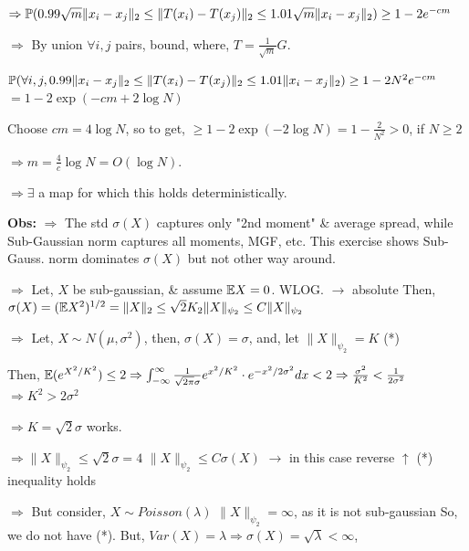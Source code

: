 \documentclass[12pt]{article}
\begin{document}
$\Rightarrow \mathbb{P}(0.99 \sqrt{m} \|x_i-x_j\|_2 \leq \|T(x_i)-T(x_j)\|_2 \leq 1.01 \sqrt{m} \|x_i-x_j\|_2) \geq 1 - 2e^{-cm}$

$\Rightarrow$ By union $\forall i,j$ pairs,
bound, \hspace{4cm} where, $T = \frac{1}{\sqrt{m}} G$.

$\mathbb{P}(\forall i,j, 0.99 \|x_i-x_j\|_2 \leq \|T(x_i)-T(x_j)\|_2 \leq 1.01 \|x_i-x_j\|_2) \geq 1 - 2N^2e^{-cm}$
\hspace{7cm} $= 1 - 2\exp(-cm+2\log N)$

Choose $cm = 4\log N$, so to get, $\geq 1 - 2\exp(-2\log N) = 1 - \frac{2}{N^2} > 0$, if $N \geq 2$

$\Rightarrow m = \frac{4}{c}\log N = O(\log N)$.

$\Rightarrow \exists$ a map for which this holds deterministically.

\textbf{Obs:}
$\Rightarrow$ The std $\sigma(X)$ captures only "2nd moment" \& average spread, while Sub-Gaussian
norm captures all moments, MGF, etc. This exercise shows Sub-Gauss.
norm dominates $\sigma(X)$ but not other way around.

$\Rightarrow$ Let, $X$ be sub-gaussian, \& assume $\mathbb{E} X = 0$. WLOG.
\hspace{7cm} $\to$ absolute
Then, $\sigma(X) = (\mathbb{E} X^2)^{1/2} = \|X\|_2 \leq \sqrt{2} K_2 \|X\|_{\psi_2} \leq C \|X\|_{\psi_2}$

$\Rightarrow$ Let, $X \sim N(\mu, \sigma^2)$, then, $\sigma(X) = \sigma$, and, let $\|X\|_{\psi_2} = K$ \hspace{1cm} (*)

Then, $\mathbb{E}(e^{X^2/K^2}) \leq 2 \Rightarrow \int_{-\infty}^{\infty} \frac{1}{\sqrt{2\pi}\sigma} e^{x^2/K^2} \cdot e^{-x^2/2\sigma^2} dx < 2 \Rightarrow \frac{\sigma^2}{K^2} < \frac{1}{2\sigma^2}$
\hspace{8cm} $\Rightarrow K^2 > 2\sigma^2$

$\Rightarrow K = \sqrt{2}\sigma$ works.

$\Rightarrow \|X\|_{\psi_2} \leq \sqrt{2}\sigma = 4$ \hspace{1cm} $\boxed{\|X\|_{\psi_2} \leq C \sigma(X)}$ $\to$ in this case reverse
\hspace{5cm} $\uparrow$ (*) \hspace{2cm} inequality holds

$\Rightarrow$ But consider, $X \sim Poisson(\lambda)$
$\|X\|_{\psi_2} = \infty$, as it is not sub-gaussian
\hspace{3cm} So, we do not have (*).
But, $Var(X) = \lambda \Rightarrow \sigma(X) = \sqrt{\lambda} < \infty$,
\end{document}
